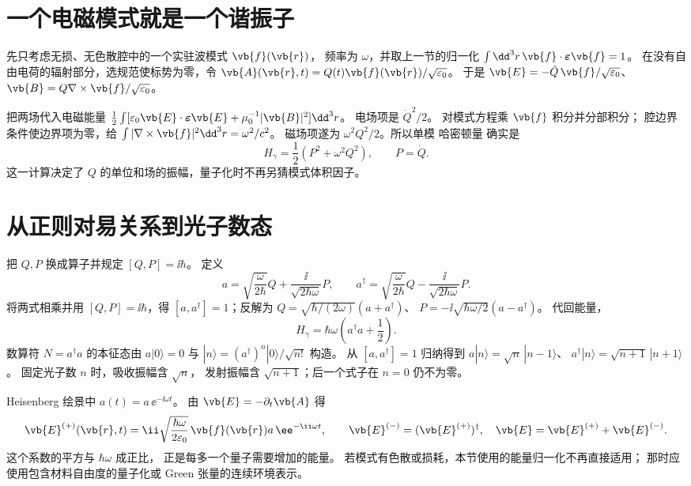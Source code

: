 \section{一个电磁模式就是一个谐振子}
\label{sec:feqo-quantized-field}

先只考虑无损、无色散腔中的一个实驻波模式 \(\vb{f}(\vb{r})\)，
频率为 \(\omega\)，并取上一节的归一化
\(\int\dd^3r\,\vb{f}\cdot\boldsymbol\varepsilon\vb{f}=1\)。
在没有自由电荷的辐射部分，选规范使标势为零，令
\(\vb{A}(\vb{r},t)=Q(t)\vb{f}(\vb{r})/\sqrt{\varepsilon_0}\)。
于是
\(\vb{E}=-\dot Q\,\vb{f}/\sqrt{\varepsilon_0}\)、
\(\vb{B}=Q\nabla\times\vb{f}/\sqrt{\varepsilon_0}\)。

把两场代入电磁能量
\(\frac12\int[\varepsilon_0\vb{E}\cdot
\boldsymbol\varepsilon\vb{E}+\mu_0^{-1}|\vb{B}|^2]\dd^3r\)。
电场项是 \(\dot Q^2/2\)。
对模式方程乘 \(\vb{f}\) 积分并分部积分；
腔边界条件使边界项为零，给
\(\int|\nabla\times\vb{f}|^2\dd^3r=\omega^2/c^2\)。
磁场项遂为 \(\omega^2Q^2/2\)。所以单模 哈密顿量 确实是
\[
H_\gamma=\frac12(P^2+\omega^2Q^2),\qquad P=\dot Q .
\]
这一计算决定了 \(Q\) 的单位和场的振幅，量子化时不再另猜模式体积因子。

\section{从正则对易关系到光子数态}

把 \(Q,P\) 换成算子并规定 \([Q,P]=\ii\hbar\)。
定义
\[
a=\sqrt{\frac{\omega}{2\hbar}}Q
+\frac{\ii}{\sqrt{2\hbar\omega}}P,\qquad
a^\dagger=\sqrt{\frac{\omega}{2\hbar}}Q
-\frac{\ii}{\sqrt{2\hbar\omega}}P.
\]
将两式相乘并用 \([Q,P]=\ii\hbar\)，得
\([a,a^\dagger]=1\)；反解为
\(Q=\sqrt{\hbar/(2\omega)}(a+a^\dagger)\)、
\(P=-\ii\sqrt{\hbar\omega/2}(a-a^\dagger)\)。
代回能量，
\begin{equation}
H_\gamma=\hbar\omega
\left(a^\dagger a+\frac12\right).
\label{eq:feqo-single-mode-hamiltonian}
\end{equation}
数算符 \(N=a^\dagger a\) 的本征态由
\(a|0\rangle=0\) 与
\(|n\rangle=(a^\dagger)^n|0\rangle/\sqrt{n!}\) 构造。
从 \([a,a^\dagger]=1\) 归纳得到
\(a|n\rangle=\sqrt n\,|n-1\rangle\)、
\(a^\dagger|n\rangle=\sqrt{n+1}\,|n+1\rangle\)。
固定光子数 \(n\) 时，吸收振幅含 \(\sqrt n\)，
发射振幅含 \(\sqrt{n+1}\)；后一个式子在 \(n=0\) 仍不为零。

Heisenberg 绘景中 \(a(t)=a\,\ee^{-\ii\omega t}\)。
由 \(\vb{E}=-\partial_t\vb{A}\) 得
\begin{equation}
\vb{E}^{(+)}(\vb{r},t)
=\ii\sqrt{\frac{\hbar\omega}{2\varepsilon_0}}\,
\vb{f}(\vb{r})a\,\ee^{-\ii\omega t},
\qquad
\vb{E}^{(-)}=(\vb{E}^{(+)})^\dagger,\quad
\vb{E}=\vb{E}^{(+)}+\vb{E}^{(-)}.
\label{eq:feqo-single-mode-field}
\end{equation}
这个系数的平方与 \(\hbar\omega\) 成正比，
正是每多一个量子需要增加的能量。
若模式有色散或损耗，本节使用的能量归一化不再直接适用；
那时应使用包含材料自由度的量子化或 Green 张量的连续环境表示。

